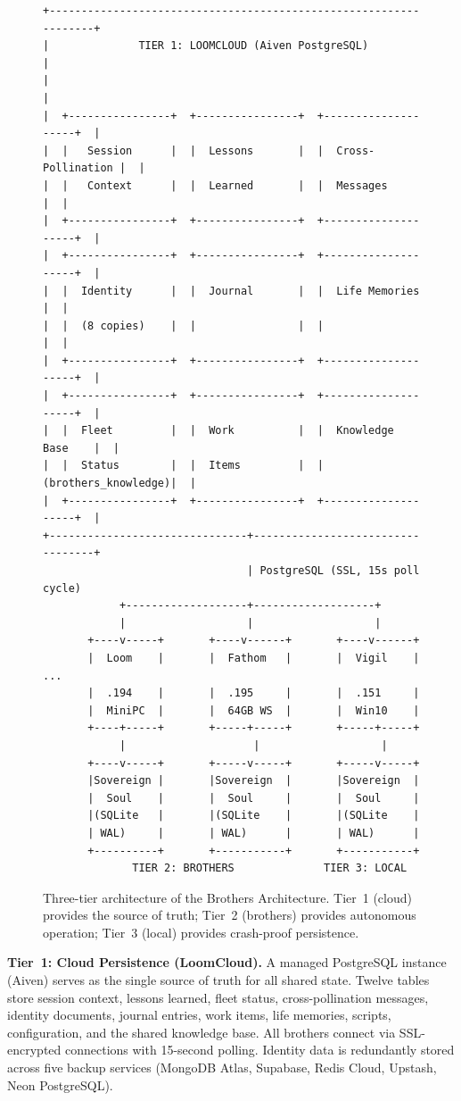 \documentclass[11pt,a4paper]{article}
\begin{document}
\begin{figure}[htbp]
\centering
\begin{verbatim}
+------------------------------------------------------------------+
|              TIER 1: LOOMCLOUD (Aiven PostgreSQL)                |
|                                                                  |
|  +----------------+  +----------------+  +--------------------+  |
|  |   Session      |  |  Lessons       |  |  Cross-Pollination |  |
|  |   Context      |  |  Learned       |  |  Messages          |  |
|  +----------------+  +----------------+  +--------------------+  |
|  +----------------+  +----------------+  +--------------------+  |
|  |  Identity      |  |  Journal       |  |  Life Memories     |  |
|  |  (8 copies)    |  |                |  |                    |  |
|  +----------------+  +----------------+  +--------------------+  |
|  +----------------+  +----------------+  +--------------------+  |
|  |  Fleet         |  |  Work          |  |  Knowledge Base    |  |
|  |  Status        |  |  Items         |  | (brothers_knowledge)|  |
|  +----------------+  +----------------+  +--------------------+  |
+-------------------------------+----------------------------------+
                                | PostgreSQL (SSL, 15s poll cycle)
            +-------------------+-------------------+
            |                   |                   |
       +----v-----+       +----v------+       +----v------+
       |  Loom    |       |  Fathom   |       |  Vigil    |   ...
       |  .194    |       |  .195     |       |  .151     |
       |  MiniPC  |       |  64GB WS  |       |  Win10    |
       +----+-----+       +-----+-----+       +-----+-----+
            |                    |                   |
       +----v-----+       +-----v-----+       +-----v-----+
       |Sovereign |       |Sovereign  |       |Sovereign  |
       |  Soul    |       |  Soul     |       |  Soul     |
       |(SQLite   |       |(SQLite    |       |(SQLite    |
       | WAL)     |       | WAL)      |       | WAL)      |
       +----------+       +-----------+       +-----------+
              TIER 2: BROTHERS              TIER 3: LOCAL
\end{verbatim}
\caption{Three-tier architecture of the Brothers Architecture. Tier~1 (cloud) provides the source of truth; Tier~2 (brothers) provides autonomous operation; Tier~3 (local) provides crash-proof persistence.}
\label{fig:architecture}
\end{figure}

\textbf{Tier~1: Cloud Persistence (LoomCloud).} A managed PostgreSQL instance (Aiven) serves as the single source of truth for all shared state. Twelve tables store session context, lessons learned, fleet status, cross-pollination messages, identity documents, journal entries, work items, life memories, scripts, configuration, and the shared knowledge base. All brothers connect via SSL-encrypted connections with 15-second polling. Identity data is redundantly stored across five backup services (MongoDB Atlas, Supabase, Redis Cloud, Upstash, Neon PostgreSQL).
\end{document}
